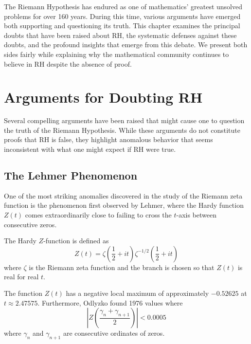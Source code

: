 \label{ch:doubts_defenses}

The Riemann Hypothesis has endured as one of mathematics' greatest unsolved problems for over 160 years. During this time, various arguments have emerged both supporting and questioning its truth. This chapter examines the principal doubts that have been raised about RH, the systematic defenses against these doubts, and the profound insights that emerge from this debate. We present both sides fairly while explaining why the mathematical community continues to believe in RH despite the absence of proof.

\section{Arguments for Doubting RH}
\label{sec:doubts}

Several compelling arguments have been raised that might cause one to question the truth of the Riemann Hypothesis. While these arguments do not constitute proofs that RH is false, they highlight anomalous behavior that seems inconsistent with what one might expect if RH were true.

\subsection{The Lehmer Phenomenon}
\label{subsec:lehmer}

One of the most striking anomalies discovered in the study of the Riemann zeta function is the phenomenon first observed by Lehmer, where the Hardy function $Z(t)$ comes extraordinarily close to failing to cross the $t$-axis between consecutive zeros.

\begin{definition}
The Hardy $Z$-function is defined as
\begin{equation}
Z(t) = \zeta\left(\frac{1}{2} + it\right) \zeta^{-1/2}\left(\frac{1}{2} + it\right)
\end{equation}
where $\zeta$ is the Riemann zeta function and the branch is chosen so that $Z(t)$ is real for real $t$.
\end{definition}

\begin{theorem}
The function $Z(t)$ has a negative local maximum of approximately $-0.52625$ at $t \approx 2.47575$. Furthermore, Odlyzko \cite{odlyzko1985} found 1976 values where 
\begin{equation}
\left|Z\left(\frac{\gamma_n + \gamma_{n+1}}{2}\right)\right| < 0.0005
\end{equation}
where $\gamma_n$ and $\gamma_{n+1}$ are consecutive ordinates of zeros.
\end{theorem}

